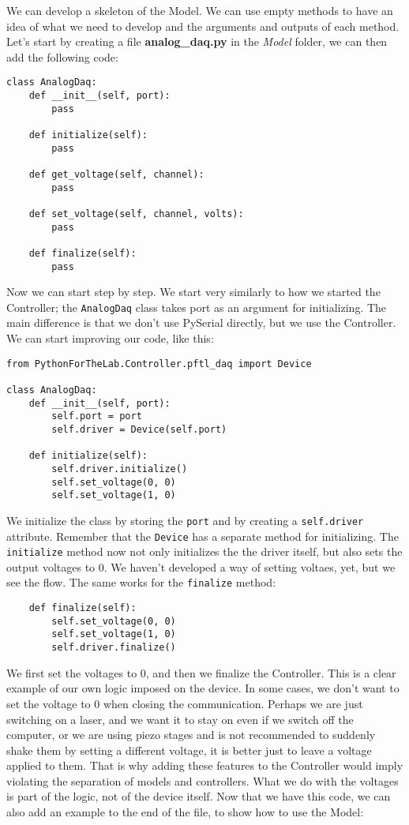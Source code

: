 We can develop a skeleton of the Model. We can use empty methods to have an idea of what we need to develop and the arguments and outputs of each method. Let's start by creating a file \textbf{analog\_daq.py} in the \emph{Model} folder, we can then add the following code:

\begin{verbatim}
class AnalogDaq:
    def __init__(self, port):
        pass

    def initialize(self):
        pass

    def get_voltage(self, channel):
        pass

    def set_voltage(self, channel, volts):
        pass

    def finalize(self):
        pass
\end{verbatim}

Now we can start step by step. We start very similarly to how we started the Controller; the \texttt{AnalogDaq} class takes port as an argument for initializing. The main difference is that we don't use PySerial directly, but we use the Controller. We can start improving our code, like this:

\begin{verbatim}
from PythonForTheLab.Controller.pftl_daq import Device

class AnalogDaq:
    def __init__(self, port):
        self.port = port
        self.driver = Device(self.port)

    def initialize(self):
        self.driver.initialize()
        self.set_voltage(0, 0)
        self.set_voltage(1, 0)
\end{verbatim}

We initialize the class by storing the \texttt{port} and by creating a \texttt{self.driver} attribute. Remember that the \texttt{Device} has a separate method for initializing. The \texttt{initialize} method now not only initializes the the driver itself, but also sets the output voltages to 0. We haven't developed a way of setting voltaes, yet, but we see the flow. The same works for the \texttt{finalize} method:

\begin{verbatim}
    def finalize(self):
        self.set_voltage(0, 0)
        self.set_voltage(1, 0)
        self.driver.finalize()
\end{verbatim}

We first set the voltages to $0$, and then we finalize the Controller. This is a clear example of our own logic imposed on the device. In some cases, we don't want to set the voltage to 0 when closing the communication. Perhaps we are just switching on a laser, and we want it to stay on even if we switch off the computer, or we are using piezo stages and is not recommended to suddenly shake them by setting a different voltage, it is better just to leave a voltage applied to them. That is why adding these features to the Controller would imply violating the separation of models and controllers. What we do with the voltages is part of the logic, not of the device itself. Now that we have this code, we can also add an example to the end of the file, to show how to use the Model:

